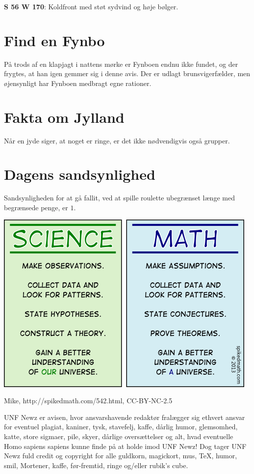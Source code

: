 \begin{minipage}[b]{0.95\linewidth}
\begin{minipage}[t]{0.47\textwidth}
\textbf{S 56 W 170}: Koldfront med støt sydvind og høje bølger.

\section*{Find en Fynbo}
På trods af en klapjagt i nattens mørke er Fynboen endnu ikke fundet, og der frygtes, at han igen gemmer sig i denne avis. Der er udlagt brunsvigerfælder, men øjensynligt har Fynboen medbragt egne rationer.

\section*{Fakta om Jylland}
Når en jyde siger, at noget er ringe, er det ikke nødvendigvis også grupper.

\section*{Dagens sandsynlighed}
Sandsynligheden for at gå fallit, ved at spille roulette ubegrænset længe med begrænsede penge, er $1$.

\vspace{3mm}
\end{minipage}

\includegraphics[width=\textwidth]{542-science-vs-math.png}
\begin{center}
\tiny Mike, http://spikedmath.com/542.html, CC-BY-NC-2.5

\vspace{3mm}

\tiny UNF Newz er avisen, hvor ansvarshavende redaktør fralægger sig ethvert ansvar for eventuel plagiat, kaniner, tysk, stavefelj, kaffe, dårlig humor, glemsomhed, katte, store sigmaer, pile, skyer, dårlige oversættelser og alt, hvad eventuelle Homo sapiens sapiens kunne finde på at holde imod UNF Newz! Dog tager UNF Newz fuld credit og copyright for alle guldkorn, magickort, mus, \TeX, humor, smil, Mortener, kaffe, før-fremtid, ringe og/eller rubik's cube.
\end{center}
\end{minipage}

